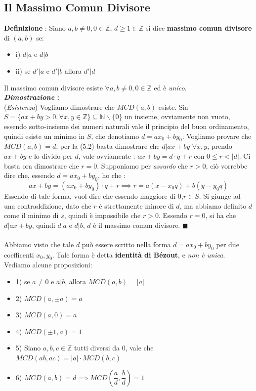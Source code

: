 \documentclass[12pt, letterpaper]{article}
\begin{document}
\subsection{Il Massimo Comun Divisore}
\textbf{Definizione }: Siano \(a,b\ne 0,0\in\mathbb{Z}\), \(d\ge1\in\mathbb{Z}\) si dice \textbf{massimo comun divisore}
di \((a,b)\) se:\begin{itemize}
    \item i) \(d|a\) e \(d|b\)
    \item ii) se \(d'|a\) e \(d'|b\) allora \(d'|d\)
\end{itemize}
Il massimo comun divisore esiste \(\forall a,b\ne 0,0\in\mathbb{Z}\) ed è \textit{unico}.\\
\textbf{\textit{Dimostrazione }:}\\
(\textit{Esistenza}) Vogliamo dimostrare che \(MCD(a,b)\) esiste. Sia \(S=\{ax+by>0,\forall x,y \in\mathbb{Z} \}\subseteq\mathbb{N}\backslash\{0\}\)
un insieme, ovviamente non vuoto, essendo sotto-insieme dei numeri naturali vale il principio del buon ordinamento, 
quindi esiste un minimo in \(S\), che denotiamo \(d=ax_0+by_0\). Vogliamo provare che \(MCD(a,b)=d\), per la (5.2) basta dimostrare 
che \(d|ax+by\)  \( \forall x,y\), prendo \(ax+by\) e lo divido per \(d\), vale ovviamente : \(ax+by=d\cdot q+r\) 
con \(0\le r < |d|\). Ci basta ora dimostrare che \(r=0\). Supponiamo per \textit{assurdo} che \(r>0\), ciò vorrebbe 
dire che, essendo \(d=ax_0+by_0\), ho che :\begin{equation}
    ax+by=(ax_0+by_0)\cdot q +r\implies r= a(x-x_0q)+b(y-y_0q)
\end{equation}
Essendo di tale forma, vuol dire che essendo maggiore di 0,\(r\in S\). Si giunge ad una contraddizione, dato 
che \(r\) è strettamente minore di \(d\), ma abbiamo definito \(d\) come il minimo di \(s\), quindi è impossibile 
che \(r>0\). Essendo \(r=0\), si ha che \(d|ax+by\), quindi \(d|a\) e  \(d|b\), \(d\) è il massimo comun divisore. \(\blacksquare\)
\\\hphantom{.}\\Abbiamo visto che tale \(d\) può essere scritto nella forma \(d=ax_0+by_0\) per due coefficenti \(x_0,y_0\). Tale 
forma è detta \textbf{identità di Bézout}, e \textit{non è unica}. Vediamo alcune proposizioni:\begin{itemize}
    \item 1) se \(a\ne0\) e \(a|b\), allora \(MCD(a,b)=|a|\)
    \item 2) \(MCD(a,\pm a)=a\)
    \item 3) \(MCD(a,0)=a\)
    \item 4) \(MCD(\pm 1,a)=1\)
    \item 5) Siano \(a,b,c \in \mathbb{Z}\) tutti diversi da 0, vale che \(MCD(ab,ac)=|a|\cdot MCD(b,c)\)
    \item 6) \(MCD(a,b)=d\implies MCD(\dfrac{a}{d},\dfrac{b}{d})=1\)
\end{itemize}
\end{document}
